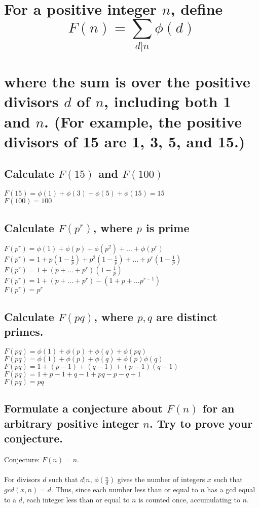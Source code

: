 \documentclass[12pt]{article}
\begin{document}
\section{For a positive integer $n$, define\\ $$F(n) = \sum_{d|n} \phi(d)$$\\ where the sum is over the positive divisors $d$ of $n$, including both 1 and $n$. (For example, the positive divisors of 15 are 1, 3, 5, and 15.)}
\subsection{Calculate $F(15)$ and $F(100)$}
$F(15) = \phi(1) + \phi(3) + \phi(5) + \phi(15) = 15$\\
$F(100) = 100$

\subsection{Calculate $F(p^r)$, where $p$ is prime}
$F(p^r) = \phi(1) + \phi(p) + \phi(p^2) + ... + \phi(p^r)$\\
$F(p^r) = 1 + p(1-\frac{1}{p}) + p^2(1-\frac{1}{p}) + ... + p^r(1-\frac{1}{p})$\\
$F(p^r) = 1 + (p + ... + p^r)(1-\frac{1}{p})$\\
$F(p^r) = 1 + (p + ... + p^r) - (1 + p + ... p^{r-1})$\\
$F(p^r) = p^r$

\subsection{Calculate $F(pq)$, where $p,q$ are distinct primes.}
$F(pq) = \phi(1) + \phi(p) + \phi(q) + \phi(pq)$\\
$F(pq) = \phi(1) + \phi(p) + \phi(q) + \phi(p)\phi(q)$\\
$F(pq) = 1 + (p-1) + (q-1) + (p-1)(q-1)$\\
$F(pq) = 1 + p-1 + q-1 + pq - p - q + 1$\\
$F(pq) = pq$

\subsection{Formulate a conjecture about $F(n)$ for an arbitrary positive integer $n$. Try to prove your conjecture.}
Conjecture: $F(n) = n$.\\\\
For divisors $d$ such that $d|n$, $\phi(\frac{n}{d})$ gives the number of integers $x$ such that $gcd(x,n) = d$.
Thus, since each number less than or equal to $n$ has a gcd equal to a $d$, each integer less than or equal to $n$ is counted once, accumulating to $n$.
\end{document}

